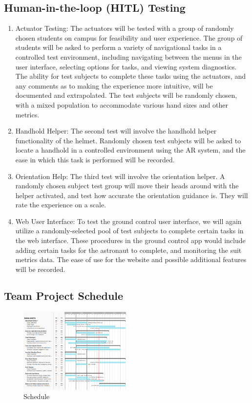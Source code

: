 \documentclass{article}
\let\Oldsubsection\subsection
\renewcommand{\subsection}{\FloatBarrier\Oldsubsection}
\begin{document}
\subsection{Human-in-the-loop (HITL) Testing}

\begin{enumerate}
\item Actuator Testing: The actuators will be tested with a group of randomly chosen students on campus for feasibility and user experience. The group of students will be asked to perform a variety of navigational tasks in a controlled test environment, including navigating between the menus in the user interface, selecting options for tasks, and viewing system diagnostics. The ability for test subjects to complete these tasks using the actuators, and any comments as to making the experience more intuitive, will be documented and extrapolated. The test subjects will be randomly chosen, with a mixed population to accommodate various hand sizes and other metrics.
\item Handhold Helper: The second test will involve the handhold helper functionality of the helmet. Randomly chosen test subjects will be asked to locate a handhold in a controlled environment using the AR system, and the ease in which this task is performed will be recorded.
\item Orientation Help: The third test will involve the orientation helper. A randomly chosen subject test group will move their heads around with the helper activated, and test how accurate the orientation guidance is. They will rate the experience on a scale.
\item Web User Interface: To test the ground control user interface, we will again utilize a randomly-selected pool of test subjects to complete certain tasks in the web interface. These procedures in the ground control app would include adding certain tasks for the astronaut to complete, and monitoring the suit metrics data. The ease of use for the website and possible additional features will be recorded.
\end{enumerate}

\subsection{Team Project Schedule}

\begin{figure}[!htb]
  \centering
  \includegraphics[width=0.5\textwidth]{assets/supertaskschedule.png}
  \caption{Schedule}
  \label{fig:supertaskschedule}
\end{figure}
\end{document}

